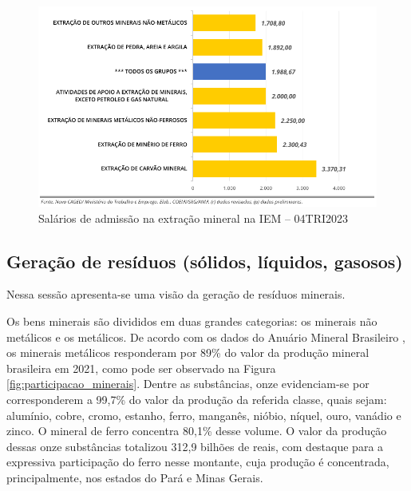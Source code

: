 \begin{figure}[!htb]
    \centering
    \includegraphics[width=\textwidth]{figures/image11_salarios_admissao.png}
    \caption{Salários de admissão na extração mineral na IEM -- 04TRI2023}
    \label{fig:salarios_admissao}
\end{figure}

\subsection{Geração de resíduos (sólidos, líquidos, gasosos)}
\label{subsec:geracao_residuos}

Nessa sessão apresenta-se uma visão da geração de resíduos minerais.

Os bens minerais são divididos em duas grandes categorias: os minerais não metálicos e os metálicos. De acordo com os dados do Anuário Mineral Brasileiro \cite{anm2022anuario}, os minerais metálicos responderam por 89\% do valor da produção mineral brasileira em 2021, como pode ser observado na Figura \ref{fig:participacao_minerais}. Dentre as substâncias, onze evidenciam-se por corresponderem a
99,7\% do valor da produção da referida classe, quais sejam: alumínio, cobre, cromo, estanho, ferro, manganês, nióbio, níquel, ouro, vanádio e zinco. O mineral de ferro concentra 80,1\% desse volume. O valor da produção dessas onze substâncias totalizou 312,9 bilhões de reais, com destaque para a expressiva participação do ferro nesse montante, cuja produção é concentrada, principalmente, nos estados do Pará e Minas Gerais.

